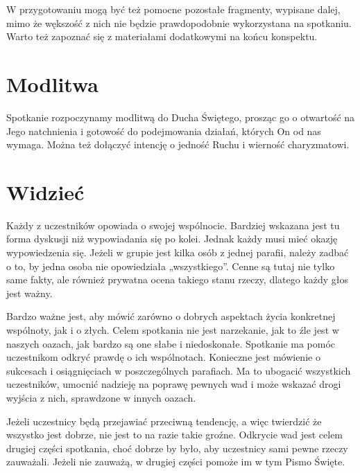 \documentclass[a5paper,10pt,polish]{book}
\begin{document}
W przygotowaniu  mogą być też pomocne pozostałe fragmenty, wypisane dalej, mimo że wększość  z nich nie będzie prawdopodobnie  wykorzystana  na spotkaniu. Warto też zapoznać się z materiałami dodatkowymi na końcu konspektu.


\section{Modlitwa}
\label{babice2006-jesien-gliwice/spotkanie3:modlitwa}
Spotkanie rozpoczynamy modlitwą do Ducha Świętego, prosząc go o otwartość na Jego natchnienia i gotowość do podejmowania działań, których On od nas wymaga. Można też dołączyć intencję o jedność Ruchu i wierność charyzmatowi.


\section{Widzieć}
\label{babice2006-jesien-gliwice/spotkanie3:widziec}
Każdy z uczestników opowiada o swojej wspólnocie. Bardziej wskazana jest tu forma dyskusji niż wypowiadania  się po kolei. Jednak każdy musi mieć okazję wypowiedzenia się. Jeżeli w grupie jest kilka osób z jednej parafii, należy zadbać o to, by jedna osoba nie opowiedziała „wszystkiego”. Cenne są tutaj nie tylko same fakty, ale również prywatna ocena takiego stanu rzeczy, dlatego każdy głos jest ważny.

Bardzo ważne jest, aby mówić zarówno o dobrych aspektach życia konkretnej wspólnoty, jak i o złych. Celem spotkania nie jest narzekanie, jak to źle jest w naszych oazach, jak bardzo są one słabe i niedoskonałe. Spotkanie ma pomóc uczestnikom odkryć prawdę o ich wspólnotach. Konieczne jest mówienie o sukcesach i osiągnięciach w poszczególnych parafiach. Ma to ubogacić wszystkich uczestników, umocnić nadzieję na poprawę pewnych wad i może wskazać drogi wyjścia z nich, sprawdzone w innych oazach.

Jeżeli uczestnicy będą przejawiać przeciwną tendencję, a więc twierdzić że wszystko jest  dobrze, nie jest  to na razie takie  groźne. Odkrycie wad jest  celem drugiej części spotkania,  choć dobrze by było, aby uczestnicy sami pewne rzeczy zauważali. Jeżeli nie zauważą, w drugiej części pomoże im w tym Pismo Święte.
\end{document}
